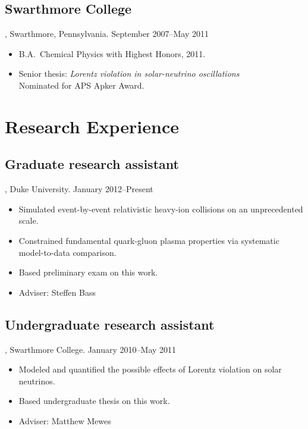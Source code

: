 \documentclass[letterpaper,10pt]{article}
\begin{document}
\subsection{Swarthmore College}, Swarthmore, Pennsylvania. \hfill September 2007--May 2011

\begin{itemize}
  \item B.A.\ Chemical Physics with Highest Honors, 2011.
  \item Senior thesis:  \emph{Lorentz violation in solar-neutrino oscillations} \\
          Nominated for APS Apker Award.
\end{itemize}



\section{Research Experience}


\subsection{Graduate research assistant}, Duke University. \hfill January 2012--Present

\begin{itemize}
  \item Simulated event-by-event relativistic heavy-ion collisions on an unprecedented scale.
  \item Constrained fundamental quark-gluon plasma properties via systematic model-to-data comparison.
  \item Based preliminary exam on this work.
  \item Adviser:  Steffen Bass
\end{itemize}


\subsection{Undergraduate research assistant}, Swarthmore College. \hfill January 2010--May 2011

\begin{itemize}
  \item Modeled and quantified the possible effects of Lorentz violation on solar neutrinos.
  \item Based undergraduate thesis on this work.
  \item Adviser:  Matthew Mewes
\end{itemize}
\end{document}
